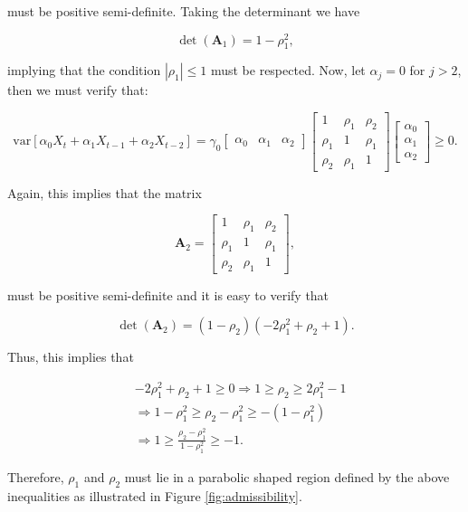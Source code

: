 \documentclass[]{book}
\theoremstyle{definition}
\theoremstyle{definition}
\theoremstyle{definition}
\theoremstyle{remark}
\begin{document}
must be positive semi-definite. Taking the determinant we have

\[\operatorname{det} \left(\boldsymbol{A}_1\right) = 1 - \rho_1^2, \]

implying that the condition \(|\rho_1| \leq 1\) must be respected. Now,
let \(\alpha_j = 0\) for \(j > 2\), then we must verify that:

\[\text{var} \left[ \alpha_0 X_{t} + \alpha_1 X_{t-1}  + \alpha_2 X_{t-2} \right] = \gamma_0 \begin{bmatrix}
     \alpha_0 & \alpha_1 &\alpha_2
     \end{bmatrix}   \begin{bmatrix}
     1 & \rho_1 & \rho_2\\
     \rho_1 & 1 & \rho_1 \\
     \rho_2 & \rho_1 & 1
     \end{bmatrix} \begin{bmatrix}
     \alpha_0 \\
     \alpha_1 \\
     \alpha_2
     \end{bmatrix} \geq 0. \]

Again, this implies that the matrix

\[ \boldsymbol{A}_2 = \begin{bmatrix}
  1 & \rho_1 & \rho_2\\
  \rho_1 & 1 & \rho_1 \\
  \rho_2 & \rho_1 & 1
  \end{bmatrix}, \]

must be positive semi-definite and it is easy to verify that

\[\operatorname{det} \left(\boldsymbol{A}_2\right) = \left(1 - \rho_2 \right)\left(- 2 \rho_1^2 + \rho_2 + 1\right). \]

Thus, this implies that

\[\begin{aligned} &- 2 \rho_1^2 + \rho_2 + 1 \geq 0 \Rightarrow 1 \geq \rho_2 \geq 2 \rho_1^2 - 1 \\
   &\Rightarrow 1 - \rho_1^2 \geq \rho_2 - \rho_1^2 \geq -(1 - \rho_1^2)\\
   &\Rightarrow 1 \geq \frac{\rho_2 - \rho_1^2 }{1 - \rho_1^2} \geq -1.
   \end{aligned}\]

Therefore, \(\rho_1\) and \(\rho_2\) must lie in a parabolic shaped
region defined by the above inequalities as illustrated in Figure
\ref{fig:admissibility}.
\end{document}
